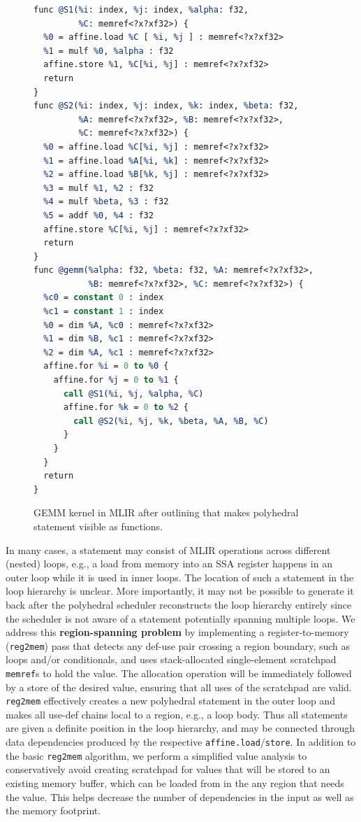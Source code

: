 \documentclass[sigplan]{acmart}
\newcommand{\icode}[1]{{\texttt {#1}}}
\newcommand{\memref}{\icode{memref}\xspace}
\begin{document}
\begin{figure}
{\scriptsize
\begin{lstlisting}[language=llvm, escapeinside=**, mathescape=true]
func @S1(%i: index, %j: index, %alpha: f32,
         %C: memref<?x?xf32>) {
  %0 = affine.load %C [ %i, %j ] : memref<?x?xf32>
  %1 = mulf %0, %alpha : f32
  affine.store %1, %C[%i, %j] : memref<?x?xf32>
  return
}
func @S2(%i: index, %j: index, %k: index, %beta: f32,
         %A: memref<?x?xf32>, %B: memref<?x?xf32>,
         %C: memref<?x?xf32>) {
  %0 = affine.load %C[%i, %j] : memref<?x?xf32>
  %1 = affine.load %A[%i, %k] : memref<?x?xf32>
  %2 = affine.load %B[%k, %j] : memref<?x?xf32>
  %3 = mulf %1, %2 : f32
  %4 = mulf %beta, %3 : f32
  %5 = addf %0, %4 : f32
  affine.store %C[%i, %j] : memref<?x?xf32>
  return
}
func @gemm(%alpha: f32, %beta: f32, %A: memref<?x?xf32>,
           %B: memref<?x?xf32>, %C: memref<?x?xf32>) {
  %c0 = constant 0 : index
  %c1 = constant 1 : index
  %0 = dim %A, %c0 : memref<?x?xf32>
  %1 = dim %B, %c1 : memref<?x?xf32>
  %2 = dim %A, %c1 : memref<?x?xf32>
  affine.for %i = 0 to %0 {
    affine.for %j = 0 to %1 {
      call @S1(%i, %j, %alpha, %C)
      affine.for %k = 0 to %2 {
        call @S2(%i, %j, %k, %beta, %A, %B, %C)
      }
    }
  }
  return
}
\end{lstlisting}
}
\caption{GEMM kernel in MLIR after outlining that makes polyhedral statement visible as functions.}
\end{figure}

In many cases, a statement may consist of MLIR operations across different (nested) loops, e.g., a load from memory into an SSA register happens in an outer loop while it is used in inner loops. The location of such a statement in the loop hierarchy is unclear. More importantly, it may not be possible to generate it back after the polyhedral scheduler reconstructs the loop hierarchy entirely since the scheduler is not aware of a statement potentially spanning multiple loops.
We address this \textbf{region-spanning problem} by implementing a register-to-memory (\icode{reg2mem}) pass that detects any def-use pair crossing a region boundary, such as loops and/or conditionals, and uses stack-allocated single-element scratchpad {\memref}s to hold the value.
The allocation operation will be immediately followed by a store of the desired value, ensuring that all uses of the scratchpad are valid.
\icode{reg2mem} effectively creates a new polyhedral statement in the outer loop and makes all use-def chains local to a region, e.g., a loop body.
Thus all statements are given a definite position in the loop hierarchy, and may be connected through data dependencies produced by the respective \icode{affine.load}/\icode{store}.
In addition to the basic \icode{reg2mem} algorithm, we perform a simplified value analysis to conservatively avoid creating scratchpad for values that will be stored to an existing memory buffer, which can be loaded from in the any region that needs the value. This helps decrease the number of dependencies in the input as well as the memory footprint.
\end{document}
